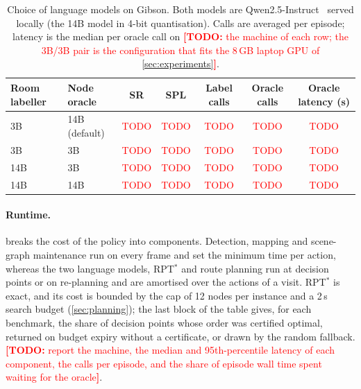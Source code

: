 \documentclass[10pt]{article}
\newcommand{\TODO}[1]{\textcolor{red}{\textbf{[TODO:} #1\textbf{]}}}
\newcommand{\tbd}{\textcolor{red}{TODO}}
\newcommand{\SR}{\textsc{SR}\xspace}
\newcommand{\SPL}{\textsc{SPL}\xspace}
\begin{document}
\begin{table}[t]
\centering
\small
\caption{Choice of language models on Gibson. Both models are Qwen2.5-Instruct~\citep{yang2024qwen25} served
locally (the 14B model in 4-bit quantisation). Calls are averaged per episode; latency is the median per oracle call
on \protect\TODO{the machine of each row; the 3B/3B pair is the configuration that fits the 8\,GB laptop GPU of
\cref{sec:experiments}}.}
\label{tab:llm}
\begin{tabular}{@{}llccccc@{}}
\toprule
Room labeller & Node oracle & \SR & \SPL & Label calls & Oracle calls & Oracle latency (s) \\
\midrule
3B & 14B (default) & \tbd & \tbd & \tbd & \tbd & \tbd \\
3B & 3B & \tbd & \tbd & \tbd & \tbd & \tbd \\
14B & 3B & \tbd & \tbd & \tbd & \tbd & \tbd \\
14B & 14B & \tbd & \tbd & \tbd & \tbd & \tbd \\
\bottomrule
\end{tabular}
\end{table}

\paragraph{Runtime.}
 breaks the cost of the policy into components. Detection, mapping and scene-graph maintenance run
on every frame and set the minimum time per action, whereas the two language models, RPT$^{*}$ and route planning run
at decision points or on re-planning and are amortised over the actions of a visit. RPT$^{*}$ is exact, and its cost
is bounded by the cap of 12 nodes per instance and a 2\,s search budget (\cref{sec:planning}); the last block of the
table gives, for each benchmark, the share of decision points whose order was certified optimal, returned on budget
expiry without a certificate, or drawn by the random fallback. \TODO{report the machine, the median and 95th-percentile latency of each component, the calls per
episode, and the share of episode wall time spent waiting for the oracle}.
\end{document}

